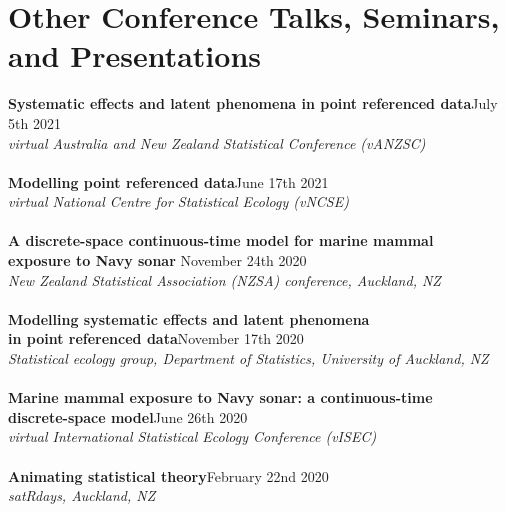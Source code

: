 \documentclass[10pt,letter]{article}
\begin{document}
\section*{Other Conference Talks, Seminars, and Presentations}
\vspace{1mm}
 {\textbf{Systematic effects and latent phenomena in point referenced data}}\hfill July 5th 2021\\
                 {\sl virtual Australia and New Zealand Statistical Conference (vANZSC)}\\
                 \hdashrule[0.5ex]{4cm}{1pt}{1pt}\\
                  {\textbf{Modelling point referenced data}}\hfill June 17th 2021\\
                 {\sl virtual National Centre for Statistical Ecology (vNCSE)}\\
                 \hdashrule[0.5ex]{4cm}{1pt}{1pt}\\
{\textbf{A discrete-space continuous-time model for marine mammal \\
           exposure to Navy sonar }}\hfill November 24th 2020\\
       {\sl New Zealand Statistical Association (NZSA) conference, Auckland, NZ}\\
       \hdashrule[0.5ex]{4cm}{1pt}{1pt}\\
{\textbf{Modelling systematic effects and latent phenomena \\
                     in point referenced data}}\hfill November 17th 2020\\
                 {\sl Statistical ecology group, Department of Statistics, University of Auckland, NZ}\\
                 \hdashrule[0.5ex]{4cm}{1pt}{1pt}\\
{\textbf{Marine mammal exposure to Navy sonar: a continuous-time \\
                     discrete-space model}}\hfill June 26th 2020\\
                 {\sl virtual International Statistical Ecology Conference (vISEC)}\\
                 \hdashrule[0.5ex]{4cm}{1pt}{1pt}\\
                           {\textbf{Animating statistical theory}}\hfill February 22nd 2020\\
                           {\sl satRdays, Auckland, NZ}\\
                           \hdashrule[0.5ex]{4cm}{1pt}{1pt}\\
\end{document}
